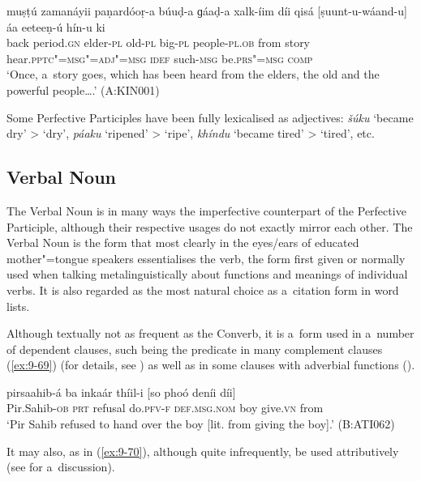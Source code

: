 \begin{exe}
\ex
\label{ex:9-68}
\gll muṣṭú zamanáyii paṇardóoṛ-a búuḍ-a ɡáaḍ-a xalk-íim díi qisá [ṣuunt-u-wáand-u] áa eeteeṇ-ú hín-u ki \\
back period.\textsc{gn} elder-\textsc{pl} old-\textsc{pl} big-\textsc{pl}  people-\textsc{pl.ob} from story hear.\textsc{pptc"=msg"=adj"=msg} \textsc{idef} such-\textsc{msg} be.\textsc{prs"=msg} \textsc{comp} \\
\glt `Once, a~story goes, which has been heard from the elders, the old and the powerful people{\ldots}.'
(A:KIN001)
\end{exe}

Some Perfective Participles have been fully lexicalised as adjectives: \textit{šúku} `became dry' {\textgreater} `dry', \textit{páaku} `ripened' {\textgreater} `ripe', \textit{khíndu} `became tired' {\textgreater} `tired', etc.


\subsection{Verbal Noun}
\label{subsec:9-3-3}


The Verbal Noun is in many ways the imperfective counterpart of the Perfective Participle, although their respective usages do not exactly mirror each other. The Verbal Noun is the form that most clearly in the eyes/ears of educated mother"=tongue speakers essentialises the verb, the form first given or normally used when talking metalinguistically about functions and meanings of individual verbs. It is also regarded as the most natural choice as a~citation form in word lists. 


Although textually not as frequent as the Converb, it is a~form used in a~number of dependent clauses, such being the predicate in many complement clauses (\ref{ex:9-69}) (for details, see ) as well as in some clauses with adverbial functions ().

\begin{exe}
\ex
\label{ex:9-69}
\gll pirsaahib-á ba inkaár thíil-i [so phoó deníi díi] \\
Pir.Sahib-\textsc{ob} \textsc{prt} refusal do.\textsc{pfv-f} \textsc{def.msg.nom} boy give.\textsc{vn} from \\
\glt `Pir Sahib refused to hand over the boy [lit. from giving the boy].' (B:ATI062)
\end{exe}

It may also, as in (\ref{ex:9-70}), although quite infrequently, be used attributively (see  for a~discussion).

